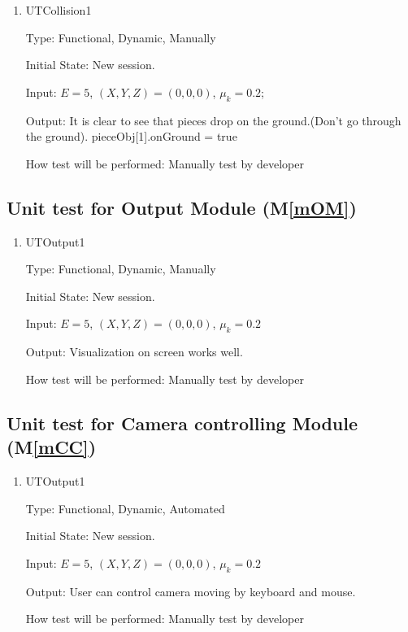 \documentclass[12pt, titlepage]{article}
\newcommand{\mref}[1]{M\ref{#1}}
\begin{document}
	\begin{enumerate}
		
		\item{UTCollision1\\}
		
		Type: Functional, Dynamic, Manually
		
		Initial State: New session.
		
		Input: $E = 5$, $(X,Y,Z) = (0,0,0)$, $\mu_{k} = 0.2$;
		
		Output: It is clear to see that pieces drop on the ground.(Don't go through the ground). pieceObj[1].onGround = true
		
		How test will be performed: Manually test by developer
		
	\end{enumerate}
	
	\subsection{Unit test for Output Module (\mref{mOM})}
	
	\begin{enumerate}
		
		\item{UTOutput1\\}
		
		Type: Functional, Dynamic, Manually
		
		Initial State: New session.
		
		Input: $E = 5$, $(X,Y,Z) = (0,0,0)$, $\mu_{k} = 0.2$
		
		Output: Visualization on screen works well.
		
		How test will be performed: Manually test by developer
		
	\end{enumerate}
	
	\subsection{Unit test for Camera controlling Module (\mref{mCC})}
	
	\begin{enumerate}
		
		\item{UTOutput1\\}
		
		Type: Functional, Dynamic, Automated
		
		Initial State: New session.
		
		Input: $E = 5$, $(X,Y,Z) = (0,0,0)$, $\mu_{k} = 0.2$
		
		Output: User can control camera moving by keyboard and mouse. 
		
		How test will be performed: Manually test by developer
		
	\end{enumerate}
	
\end{document}
